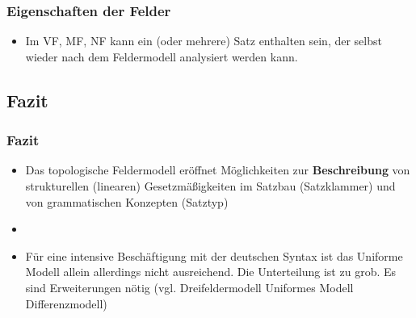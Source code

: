 \begin{frame}
\frametitle{Eigenschaften der Felder}

\begin{itemize}
	\item Im VF, MF, NF kann ein (oder mehrere) Satz enthalten sein, der selbst wieder nach dem Feldermodell analysiert werden kann. 


\begin{table}
\centering
{}
\end{table}

\end{itemize}

\end{frame}


\subsection{Fazit}


\begin{frame}
\frametitle{Fazit}

\begin{itemize}
	\item Das topologische Feldermodell eröffnet Möglichkeiten zur \textbf{Beschreibung} von strukturellen (linearen) Gesetzmäßigkeiten im Satzbau (\zB Satzklammer) und von grammatischen Konzepten (\zB Satztyp)
	\item[]
	\item Für eine intensive Beschäftigung mit der deutschen Syntax ist das Uniforme Modell allein allerdings nicht ausreichend. Die Unterteilung ist zu grob. Es sind Erweiterungen nötig (vgl. Dreifeldermodell \ras Uniformes Modell \ras Differenzmodell)

\end{itemize}

\end{frame}

